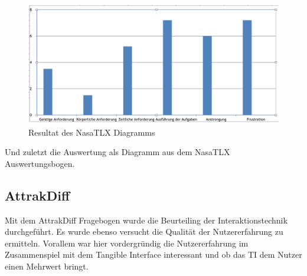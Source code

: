 \documentclass[runningheads,a4paper, 12pt]{llncs}
\begin{document}
\begin{figure}[H]
	\centering
	\includegraphics[angle=0,scale=0.4]{nasatlx_diagram}
	\caption{Resultat des NasaTLX Diagramms}
	\label{fig:result3}
\end{figure}
Und zuletzt die Auswertung als Diagramm aus dem NasaTLX Auswertungsbogen.


\subsection{AttrakDiff}
Mit dem AttrakDiff Fragebogen wurde die Beurteiling der Interaktionstechnik durchgeführt. Es wurde ebenso versucht die Qualität der Nutzererfahrung zu ermitteln. Vorallem war hier vordergründig die Nutzererfahrung im Zusammenspiel mit dem Tangible Interface interessant und ob das TI dem Nutzer einen Mehrwert bringt.
\end{document}
